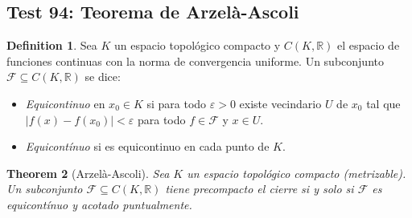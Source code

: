 \documentclass[11pt,a4paper]{article}
\theoremstyle{plain}
\newtheorem{theorem}{Theorem}[section]
\theoremstyle{definition}
\newtheorem{definition}[theorem]{Definition}
\begin{document}
\subsection*{Test 94: Teorema de Arzelà-Ascoli}

\begin{definition}
Sea $K$ un espacio topológico compacto y $C(K,\mathbb{R})$ el espacio de funciones continuas con la norma de convergencia uniforme. Un subconjunto $\mathcal{F}\subseteq C(K,\mathbb{R})$ se dice:
\begin{itemize}
\item \emph{Equicontinuo} en $x_{0}\in K$ si para todo $\varepsilon>0$ existe vecindario $U$ de $x_{0}$ tal que $|f(x)-f(x_{0})|<\varepsilon$ para todo $f\in\mathcal{F}$ y $x\in U$.
\item \emph{Equicontínuo} si es equicontinuo en cada punto de $K$.
\end{itemize}
\end{definition}

\begin{theorem}[Arzelà-Ascoli]
Sea $K$ un espacio topológico compacto (metrizable). Un subconjunto $\mathcal{F}\subseteq C(K,\mathbb{R})$ tiene precompacto el cierre si y solo si $\mathcal{F}$ es equicontínuo y acotado puntualmente.
\end{theorem}
\end{document}
